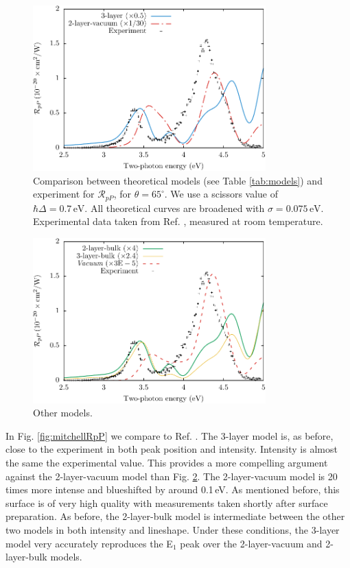 \documentclass[11pt]{book}
\begin{document}
\begin{figure}
\centering 
\includegraphics[width=0.8\textwidth]{../figures/04-results/fig-4_4_05}
\caption{Comparison between theoretical models (see Table
\ref{tab:models}) and experiment for $\mathcal{R}_{pP}$, for
$\theta=65^{\circ}$. We use a scissors value of $\hbar\Delta = 0.7\,\text{eV}$.
All theoretical curves are broadened with $\sigma=0.075\,\text{eV}$.
Experimental data taken from Ref. \cite{mejiaPRB02}, measured at room
temperature. \label{fig:RpP}}
\end{figure}

\begin{figure}
\centering 
\includegraphics[width=0.8\textwidth]{../figures/04-results/fig-4_4_06}
\caption{Other models. \label{fig:RpP}}
\end{figure}

In Fig. \ref{fig:mitchellRpP} we compare to Ref. \cite{mitchellSS01}. The 3-layer model is, as before, close to the experiment in both peak position and intensity. Intensity is almost the same the experimental value. This provides a more compelling argument against the 2-layer-vacuum model than Fig. \ref{fig:RpP}. The 2-layer-vacuum model is 20 times more intense and blueshifted by around 0.1\,eV. As mentioned before, this surface is of very high quality with measurements taken shortly after surface preparation. As before, the 2-layer-bulk model is intermediate between the other two models in both intensity and lineshape. Under these conditions, the 3-layer model very accurately reproduces the E$_{1}$ peak over the 2-layer-vacuum and 2-layer-bulk models.
\end{document}
